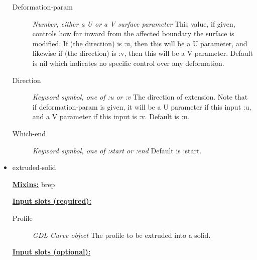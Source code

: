 \documentclass [11pt]{book}
\begin{document}
\begin{itemize}
\begin{description}
\item [Deformation-param]
\emph{Number, either a U or a V surface parameter} This value, if given, controls how
far inward from the affected boundary the surface is modified. If (the direction)
is :u, then this will be a U parameter, and likewise if (the direction) is :v,
then this will be a V parameter. Default is nil which indicates no specific
control over any deformation.


\item [Direction]
\emph{Keyword symbol, one of :u or :v} The direction of extension. Note that if
deformation-param is given, it will be a U parameter if this input :u,
and a V parameter if this input is :v. Default is :u.


\item [Which-end]
\emph{Keyword symbol, one of :start or :end} Default is :start.


\end{description}







\item {}extruded-solid


\textbf{
\underline{Mixins:}} brep





\begin{description}

\end{description}








\textbf{
\underline{Input slots (required):}}

\begin{description}

\item [Profile]
\emph{GDL Curve object} The profile to be extruded into a solid.


\end{description}






\textbf{
\underline{Input slots (optional):}}

\begin{description}


\end{description}
\end{itemize}
\end{document}
